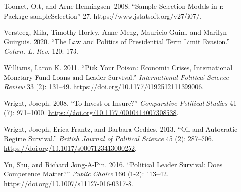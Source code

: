 \documentclass[
  12pt,
]{report}
\newlength{\cslhangindent}
\newenvironment{CSLReferences}[2] %
 {\begin{list}{}{%
  \setlength{\itemindent}{0pt}
  \setlength{\leftmargin}{0pt}
  \setlength{\parsep}{0pt}
  \ifodd #1
   \setlength{\leftmargin}{\cslhangindent}
   \setlength{\itemindent}{-1\cslhangindent}
  \fi
  \setlength{\itemsep}{#2\baselineskip}}}
 {\end{list}}
\begin{document}
\begin{CSLReferences}{1}{0}
Toomet, Ott, and Arne Henningsen. 2008. {``Sample Selection Models in
{\textbraceleft}r{\textbraceright}: Package
{\textbraceleft}sampleSelection{\textbraceright}''} 27.
\url{https://www.jstatsoft.org/v27/i07/}.

Versteeg, Mila, Timothy Horley, Anne Meng, Mauricio Guim, and Marilyn
Guirguis. 2020. {``The Law and Politics of Presidential Term Limit
Evasion.''} \emph{Colum. L. Rev.} 120: 173.

Williams, Laron K. 2011. {``Pick Your Poison: Economic Crises,
International Monetary Fund Loans and Leader Survival.''}
\emph{International Political Science Review} 33 (2): 131--49.
\url{https://doi.org/10.1177/0192512111399006}.

Wright, Joseph. 2008. {``To Invest or Insure?''} \emph{Comparative
Political Studies} 41 (7): 971--1000.
\url{https://doi.org/10.1177/0010414007308538}.

Wright, Joseph, Erica Frantz, and Barbara Geddes. 2013. {``Oil and
Autocratic Regime Survival.''} \emph{British Journal of Political
Science} 45 (2): 287--306.
\url{https://doi.org/10.1017/s0007123413000252}.

Yu, Shu, and Richard Jong-A-Pin. 2016. {``Political Leader Survival:
Does Competence Matter?''} \emph{Public Choice} 166 (1-2): 113--42.
\url{https://doi.org/10.1007/s11127-016-0317-8}.

\end{CSLReferences}
\end{document}
